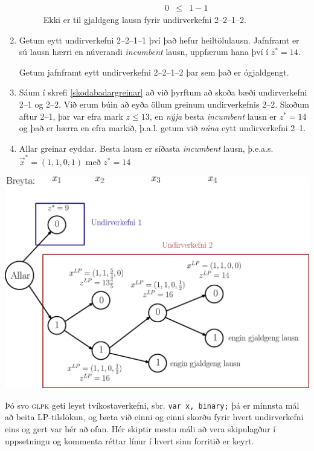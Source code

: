 \begin{lausnSYND}
\begin{enumerate}
\begin{description}
\[\begin{array}{rrrrcl}
      & & &   0 & \le & 1-1
\end{array}\]
Ekki er til gjaldgeng lausn fyrir undirverkefni 2--2--1--2.
\end{description}
\item  Getum eytt undirverkefni 2--2--1--1 því það hefur heiltölulausn. Jafnframt er sú lausn hærri en núverandi \emph{incumbent} lausn, uppfærum hana því í $z^*=14$. 

Getum jafnframt eytt undirverkefni 2--2--1--2 þar sem það er ógjaldgengt.

\item Sáum í skrefi \ref{skodabadargreinar} að við þyrftum að skoða bæði undirverkefni 2--1 og \mbox{2--2}. Við erum búin að eyða öllum greinum undirverkefnis 2--2. Skoðum aftur 2--1, þar var efra mark $z\le13$, en \emph{nýja} besta \emph{incumbent} lausn er $z^*=14$ og það er hærra en efra markið, þ.a.l. getum við \emph{núna} eytt undirverkefni 2--1.

\item Allar greinar eyddar. Besta lausn er síðasta \emph{incumbent} lausn, þ.e.a.s. $\vec{x}^*=(1,1,0,1)$ með $z^*=14$


\end{enumerate}
\begin{center}
\includegraphics[width=0.9\columnwidth]{figs/branchandbound_full.eps}
\end{center}
\end{lausnSYND}

\begin{lausnSYND} Þó svo \textsc{glpk} geti leyst tvíkostaverkefni, sbr. \texttt{var x, binary;} þá er minnsta mál að beita LP-tilslökun, og bæta við einni og einni skorðu fyrir hvert undirverkefni eins og gert var hér að ofan. Hér skiptir mestu máli að vera skipulagður í uppsetningu og kommenta réttar línur í hvert sinn forritið er keyrt.

  
\end{lausnSYND}


